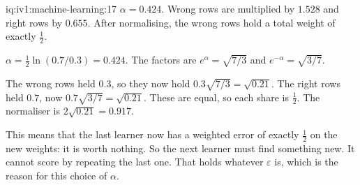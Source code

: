 \begin{solution}{iq:iv1:machine-learning:17}
$\alpha = 0.424$. Wrong rows are multiplied by $1.528$ and right rows by $0.655$. After normalising, the wrong rows hold a total weight of exactly $\frac12$.

$\alpha = \frac12\ln(0.7/0.3) = 0.424$. The factors are $e^{\alpha} = \sqrt{7/3}$ and $e^{-\alpha} = \sqrt{3/7}$.

The wrong rows held $0.3$, so they now hold $0.3\sqrt{7/3} = \sqrt{0.21}$. The right rows held $0.7$, now $0.7\sqrt{3/7} = \sqrt{0.21}$. These are equal, so each share is $\frac12$. The normaliser is $2\sqrt{0.21} = 0.917$.

This means that the last learner now has a weighted error of exactly $\frac12$ on the new weights: it is worth nothing. So the next learner must find something new. It cannot score by repeating the last one. That holds whatever $\varepsilon$ is, which is the reason for this choice of $\alpha$.



\end{solution}

